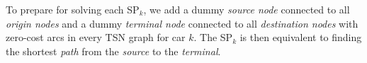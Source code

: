 \documentclass[12pt]{article}
\begin{document}



To prepare for solving each SP$_k$, we add a dummy \textit{source node} connected to all \textit{origin nodes} and a dummy \textit{terminal node} connected to all \textit{destination nodes} with zero-cost arcs in every TSN graph for car $k$. The SP$_k$ is then equivalent to finding the shortest \textit{path} from the \textit{source} to the \textit{terminal}.
\end{document}
